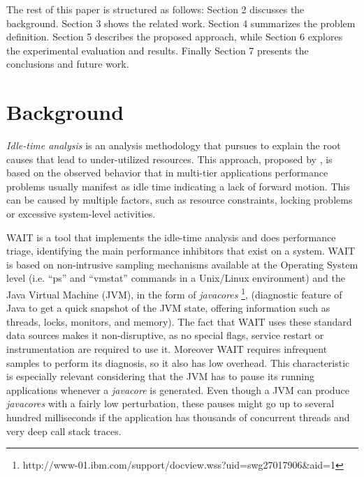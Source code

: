 \documentclass[runningheads,a4paper]{llncs}
\begin{document}
The rest of this paper is structured as follows: Section 2 discusses the
background. Section 3 shows the related work. Section 4 summarizes the
problem definition. Section 5 describes the proposed approach, while Section 6
explores the experimental evaluation and results. Finally Section 7 presents the
conclusions and future work.


\section{Background}

\emph{Idle-time analysis} is an analysis methodology that pursues to
explain the root causes that lead to under-utilized resources. This approach,
proposed by \cite{Altman2010}, is based on the observed behavior that in
multi-tier applications performance problems usually manifest as idle time
indicating a lack of forward motion. This can be caused by multiple factors,
such as resource constraints, locking problems or excessive system-level activities.

WAIT is a tool that implements the idle-time analysis and does performance
triage, identifying the main performance inhibitors that exist on a system. WAIT
is based on non-intrusive sampling mechanisms available at the Operating System
level (i.e. ``ps'' and ``vmstat'' commands in a Unix/Linux environment) and the
Java Virtual Machine (JVM), in the form of \emph{javacores}
\footnote{http://www-01.ibm.com/support/docview.wss?uid=swg27017906\&aid=1}, 
(diagnostic feature of Java to get a quick snapshot of
the JVM state, offering information such as threads, locks, monitors,
and memory). The fact that WAIT uses these standard data sources makes it
non-disruptive, as no special flags, service restart or instrumentation are
required to use it. Moreover WAIT requires infrequent samples to perform its
diagnosis, so it also has low overhead. This characteristic is especially
relevant considering that the JVM has to pause its running applications whenever a
\emph{javacore} is generated. Even though a JVM can produce \emph{javacores}
with a fairly low perturbation, these pauses might go up to several hundred
milliseconds if the application has thousands of concurrent threads and very
deep call stack traces. 
\end{document}
